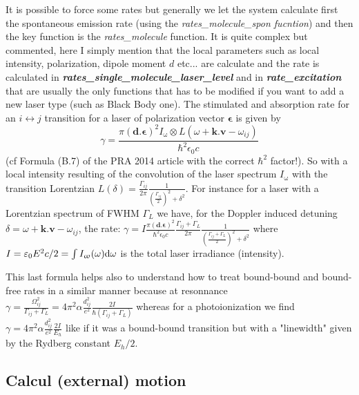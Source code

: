 \documentclass[amsmath,amssymb,nofootinbib]{revtex4-2}
\begin{document}
It is possible to force some rates  but generally we let the system calculate first the spontaneous emission rate (using the \textit{ rates\_molecule\_spon fucntion}) and then the key function is the  \textit{ rates\_molecule} function.
It is quite complex but commented, here I simply mention that the local parameters such as local intensity, polarization, dipole moment $d$ etc... are calculate and the rate is calculated in \textit{ \textbf{rates\_single\_molecule\_laser\_level}} and in \textit{ \textbf{rate\_excitation}} that are usually the only functions that has to be modified if you want to add a new laser type (such as Black Body one).
The stimulated and absorption rate for an $i\leftrightarrow j$ transition  for a  laser of polarization vector $\bm \epsilon$ is given by $$\gamma= \frac{\pi ({\bm d}.{\bm \epsilon})^2 I_\upomega \otimes L(\omega+\bm k.\bm v-\omega_{ij}) }{\hbar^2 \epsilon_ 0 c}$$  (cf Formula (B.7) of the PRA 2014 article with the correct $\hbar^2$ factor!). So with a local intensity resulting of the convolution of the laser spectrum $I_\upomega$ with the 
transition Lorentzian $L(\delta) = \frac{\Gamma_{ij}}{2\pi}\frac{1}{\left( \frac{\Gamma_{ij}}{2}\right)^2 + \delta^2}$.
For instance for a laser with a Lorentzian spectrum of FWHM $\Gamma_L$ we have, for the Doppler induced detuning $\delta = \omega+\bm k.\bm v-\omega_{ij}$, the rate:
$\gamma=
I \frac{\pi ({\bm d}.{\bm \epsilon})^2  }{\hbar^2 \epsilon_ 0 c}
 \frac{\Gamma_{ij}+\Gamma_L}{2\pi}\frac{1}{\left( \frac{\Gamma_{ij}+\Gamma_L}{2}\right)^2 + \delta^2}$  where $I= \varepsilon_0 E^2 c /2 = \int I_\upomega (\omega) {\rm d} \omega$ is the total laser irradiance (intensity).
 
 
This last formula helps also to understand how to treat bound-bound and bound-free rates in a similar manner because at resonnance
$\gamma = \frac{\Omega_{ij}^2}{\Gamma_{ij}+\Gamma_L} = 4 \pi^2 \alpha \frac{d_{ij}^2}{e^2} \frac{2 I}{\hbar (\Gamma_{ij}+\Gamma_L)} $ whereas for a photoionization we find 
$\gamma  = 4 \pi^2 \alpha \frac{d_{ij}^2}{e^2} \frac{ 2 I}{E_h} $ like if it was a  bound-bound transition but  with a "linewidth" given by the Rydberg constant $E_h/2$.


	\subsection{Calcul (external) motion}
\end{document}
